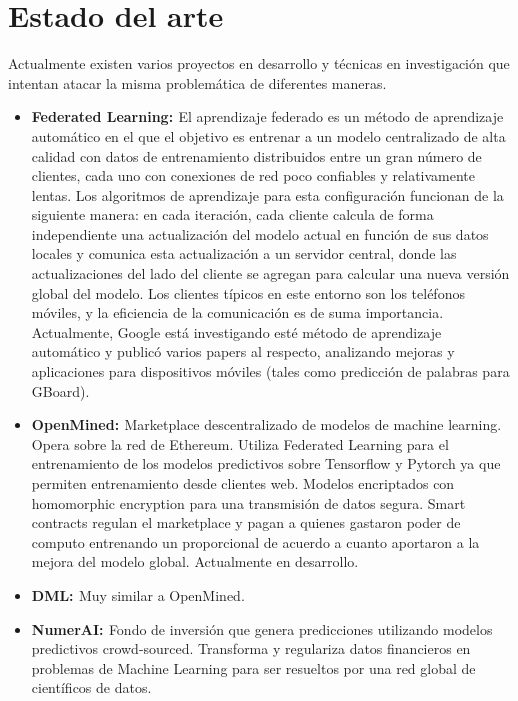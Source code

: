 \documentclass[
11pt, %
oneside, %
spanish, %
singlespacing, %
parskip, %
headsepline, %
chapterinoneline, %
]{MastersDoctoralThesis} %
\begin{document}
\chapter{Estado del arte}

Actualmente existen varios proyectos en desarrollo y técnicas en investigación que intentan atacar la misma problemática de diferentes maneras.

\begin{itemize}
\item \textbf{Federated Learning: \cite{fedlearn2}} El aprendizaje federado es un método de aprendizaje automático en el que el objetivo es entrenar a un modelo centralizado de alta calidad con datos de entrenamiento distribuidos entre un gran número de clientes, cada uno con conexiones de red poco confiables y relativamente lentas. Los algoritmos de aprendizaje para esta configuración funcionan de la siguiente manera: en cada iteración, cada cliente calcula de forma independiente una actualización del modelo actual en función de sus datos locales y comunica esta actualización a un servidor central, donde las actualizaciones del lado del cliente se agregan para calcular una nueva versión global del modelo. Los clientes típicos en este entorno son los teléfonos móviles, y la eficiencia de la comunicación es de suma importancia. Actualmente, Google está investigando \cite{fedlearn1} \cite{fedlearn3} \cite{fedlearn4} \cite{fedlearn5} \cite{fedlearn6} esté método de aprendizaje automático y publicó varios papers al respecto, analizando mejoras y aplicaciones para dispositivos móviles (tales como predicción de palabras para GBoard).

\item \textbf{OpenMined: \cite{om}} Marketplace descentralizado de modelos de machine learning. Opera sobre la red de Ethereum. Utiliza Federated Learning para el entrenamiento de los modelos predictivos sobre Tensorflow y Pytorch ya que permiten entrenamiento desde clientes web. Modelos encriptados con homomorphic encryption \cite{homenc} para una transmisión de datos segura. 
Smart contracts regulan el marketplace y pagan a quienes gastaron poder de computo entrenando un proporcional de acuerdo a cuanto aportaron a la mejora del modelo global.
Actualmente en desarrollo.

\item \textbf{DML: \cite{dml}} Muy similar a OpenMined.

\item \textbf{NumerAI: \cite{nai}} Fondo de inversión que genera predicciones utilizando modelos predictivos crowd-sourced. Transforma y regulariza datos financieros en problemas de Machine Learning para ser resueltos por una red global de científicos de datos.


\end{itemize}
\end{document}
